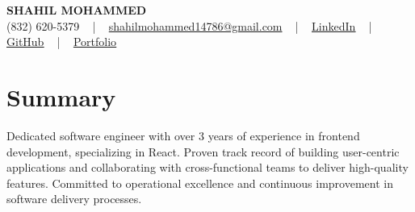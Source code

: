 \documentclass[letterpaper,10pt]{article}
\begin{document}
\begin{center}
    {\fontsize{14pt}{12pt}\selectfont \textbf{\MakeUppercase{Shahil Mohammed}}}\\ \vspace{2pt}
    \fontsize{10pt}{12pt}\selectfont (832) 620-5379 ~ | ~ \href{mailto:shahilmohammed14786@gmail.com}{shahilmohammed14786@gmail.com} ~ | ~  
    \href{https://www.linkedin.com/in/shahil-mohammed-9652931a1/}{\color{blue}\underline{LinkedIn}}  ~ | ~ 
    \href{https://github.com/freakbeast14}{\color{blue}\underline{GitHub}} ~ | ~ 
    \href{https://shahil-mohammed.netlify.app/}{\color{blue}\underline{Portfolio}}
    \vspace{-8pt}
\end{center}

\section{Summary}
\vspace{-2pt}\fontsize{8pt}{9pt}\selectfont
Dedicated software engineer with over 3 years of experience in frontend development, specializing in React. Proven track record of building user-centric applications and collaborating with cross-functional teams to deliver high-quality features. Committed to operational excellence and continuous improvement in software delivery processes.
 \vspace{-5pt}
 
\vspace{-2pt}
\end{document}
